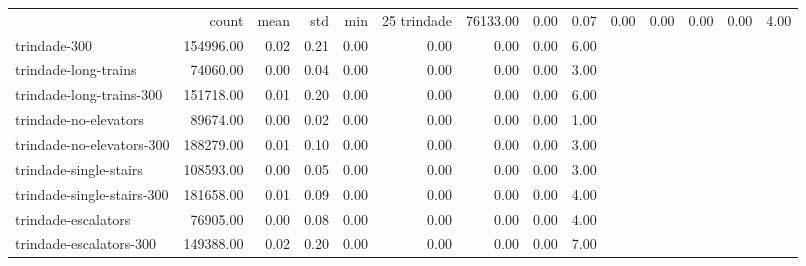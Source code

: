 \begin{tabular}{lrrrrrrrr}
 & count & mean & std & min & 25%
trindade & 76133.00 & 0.00 & 0.07 & 0.00 & 0.00 & 0.00 & 0.00 & 4.00 \\
trindade-300 & 154996.00 & 0.02 & 0.21 & 0.00 & 0.00 & 0.00 & 0.00 & 6.00 \\
trindade-long-trains & 74060.00 & 0.00 & 0.04 & 0.00 & 0.00 & 0.00 & 0.00 & 3.00 \\
trindade-long-trains-300 & 151718.00 & 0.01 & 0.20 & 0.00 & 0.00 & 0.00 & 0.00 & 6.00 \\
trindade-no-elevators & 89674.00 & 0.00 & 0.02 & 0.00 & 0.00 & 0.00 & 0.00 & 1.00 \\
trindade-no-elevators-300 & 188279.00 & 0.01 & 0.10 & 0.00 & 0.00 & 0.00 & 0.00 & 3.00 \\
trindade-single-stairs & 108593.00 & 0.00 & 0.05 & 0.00 & 0.00 & 0.00 & 0.00 & 3.00 \\
trindade-single-stairs-300 & 181658.00 & 0.01 & 0.09 & 0.00 & 0.00 & 0.00 & 0.00 & 4.00 \\
trindade-escalators & 76905.00 & 0.00 & 0.08 & 0.00 & 0.00 & 0.00 & 0.00 & 4.00 \\
trindade-escalators-300 & 149388.00 & 0.02 & 0.20 & 0.00 & 0.00 & 0.00 & 0.00 & 7.00 \\
\end{tabular}
